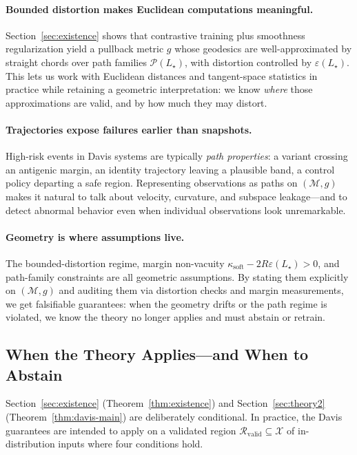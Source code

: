 \documentclass[11pt]{article}
\begin{document}
\paragraph{Bounded distortion makes Euclidean computations meaningful.}
Section~\ref{sec:existence} shows that contrastive training plus smoothness regularization yield a
pullback metric $g$ whose geodesics are well-approximated by straight chords over path families
$\mathcal{P}(L_\star)$, with distortion controlled by $\varepsilon(L_\star)$. This lets us work with
Euclidean distances and tangent-space statistics in practice while retaining a geometric
interpretation: we know \emph{where} those approximations are valid, and by how much they may
distort.

\paragraph{Trajectories expose failures earlier than snapshots.}
High-risk events in Davis systems are typically \emph{path properties}: a variant crossing an antigenic
margin, an identity trajectory leaving a plausible band, a control policy departing a safe
region. Representing observations as paths on $(\mathcal{M},g)$ makes it natural to talk about
velocity, curvature, and subspace leakage---and to detect abnormal behavior even when individual
observations look unremarkable.

\paragraph{Geometry is where assumptions live.}
The bounded-distortion regime, margin non-vacuity
$\kappa_{\mathrm{soft}} - 2R\varepsilon(L_\star) > 0$, and path-family
constraints are all geometric assumptions. By stating them explicitly on $(\mathcal{M},g)$ and
auditing them via distortion checks and margin measurements, we get falsifiable guarantees:
when the geometry drifts or the path regime is violated, we know the theory no longer applies and
must abstain or retrain.

\subsection{When the Theory Applies---and When to Abstain}

Section~\ref{sec:existence} (Theorem~\ref{thm:existence}) and
Section~\ref{sec:theory2} (Theorem~\ref{thm:davis-main}) are deliberately conditional. In practice,
the Davis guarantees are intended to apply on a validated region
$\mathcal{R}_{\mathrm{valid}} \subseteq \mathcal{X}$ of in-distribution inputs where four conditions hold.
\end{document}
